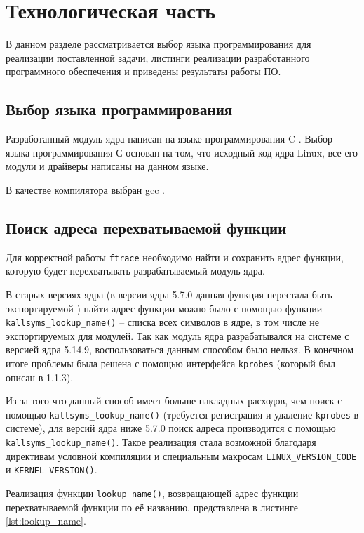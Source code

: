 \chapter{Технологическая часть}

В данном разделе рассматривается выбор языка программирования для реализации поставленной задачи, листинги реализации разработанного программного обеспечения и приведены результаты работы ПО.

\section{Выбор языка программирования}

Разработанный модуль ядра написан на языке программирования C \cite{c-language}. Выбор языка программирования С основан на том, что исходный код ядра Linux, все его модули и драйверы написаны на данном языке.

В качестве компилятора выбран gcc \cite{gcc}.

\section{Поиск адреса перехватываемой функции}

Для корректной работы \texttt{ftrace} необходимо найти и сохранить адрес функции, которую будет перехватывать разрабатываемый модуль ядра. 

В старых версиях ядра (в версии ядра 5.7.0 данная функция перестала быть экспортируемой \cite{kallsyms-removed}) найти адрес функции можно было с помощью функции \texttt{kallsyms\_lookup\_name()} -- списка всех символов в ядре, в том числе не экспортируемых для модулей. Так как модуль ядра разрабатывался на системе с версией ядра 5.14.9, воспользоваться данным способом было нельзя. В конечном итоге проблемы была решена с помощью интерфейса \texttt{kprobes} (который был описан в 1.1.3).

Из-за того что данный способ имеет больше накладных расходов, чем поиск с помощью \texttt{kallsyms\_lookup\_name()} (требуется регистрация и удаление \texttt{kprobes} в системе), для версий ядра ниже 5.7.0 поиск адреса производится с помощью \texttt{kallsyms\_lookup\_name()}. Такое реализация стала возможной благодаря директивам условной компиляции \cite{preproc} и специальным макросам 
\texttt{LINUX\_VERSION\_CODE} и \texttt{KERNEL\_VERSION()}. 

Реализация функции \texttt{lookup\_name()}, возвращающей адрес функции перехватываемой функции по её названию, представлена в листинге \ref{lst:lookup_name}.\\

